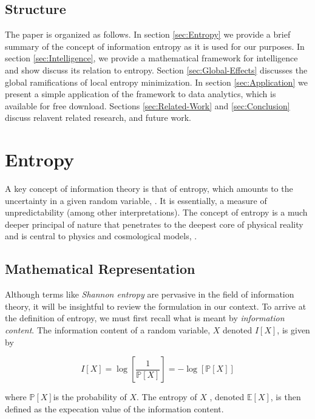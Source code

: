 \documentclass[english]{article}
\begin{document}
\subsection{Structure}

The paper is organized as follows. In section \ref{sec:Entropy} we
provide a brief summary of the concept of information entropy as it
is used for our purposes. In section \ref{sec:Intelligence}, we provide
a mathematical framework for intelligence and show discuss its relation
to entropy. Section \ref{sec:Global-Effects} discusses the global
ramifications of local entropy minimization. In section \ref{sec:Application}
we present a simple application of the framework to data analytics,
which is available for free download. Sections \ref{sec:Related-Work}
and \ref{sec:Conclusion} discuss relavent related research, and future
work.


\section{Entropy\label{sec:Entropy}}

A key concept of information theory is that of entropy, which amounts
to the uncertainty in a given random variable, \cite{ih}. It is essentially,
a measure of unpredictability (among other interpretations). The concept
of entropy is a much deeper principal of nature that penetrates to
the deepest core of physical reality and is central to physics and
cosmological models, \cite{sc,pen,hawk}.


\subsection{Mathematical Representation}

Although terms like \emph{Shannon entropy} are pervasive in the field
of information theory, it will be insightful to review the formulation
in our context. To arrive at the definition of entropy, we must first
recall what is meant by \emph{information content}. The information
content of a random variable, $X$ denoted $I\left[X\right]$, is
given by

\begin{equation}
I\left[X\right]=\log\left[\frac{1}{\mathbb{P}\left[X\right]}\right]=-\log\left[\mathbb{P}\left[X\right]\right]\label{eq:entropy}
\end{equation}


where $\mathbb{P}\left[X\right]$is the probability of $X$. The entropy
of $X$ , denoted $\mathbb{E}\left[X\right]$, is then defined as
the expecation value of the information content. 
\end{document}
